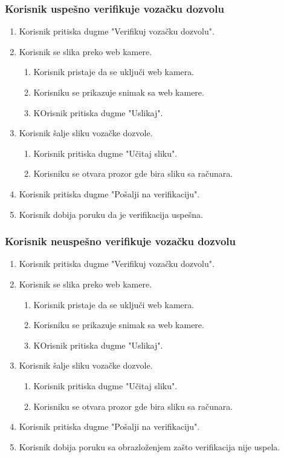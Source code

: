 \documentclass[12pt]{article}
\begin{document}
\subsubsection{Korisnik uspešno verifikuje vozačku dozvolu}
\begin{enumerate}
  \item Korisnik pritiska dugme "Verifikuj vozačku dozvolu".
  \item Korisnik se slika preko web kamere.
  \begin{enumerate}
     \item Korisnik pristaje da se uključi web kamera.
     \item Korisniku se prikazuje snimak sa web kamere.
     \item KOrisnik pritiska dugme "Uslikaj".
  \end{enumerate}
  \item Korisnik šalje sliku vozačke dozvole.
  \begin{enumerate}
     \item Korisnik pritiska dugme "Učitaj sliku".
     \item Korisniku se otvara prozor gde bira sliku sa računara.
  \end{enumerate}
  \item Korisnik pritiska dugme "Pošalji na verifikaciju".
  \item Korisnik dobija poruku da je verifikacija uspešna.
\end{enumerate}

\subsubsection{Korisnik neuspešno verifikuje vozačku dozvolu}
\begin{enumerate}
  \item Korisnik pritiska dugme "Verifikuj vozačku dozvolu".
  \item Korisnik se slika preko web kamere.
  \begin{enumerate}
     \item Korisnik pristaje da se uključi web kamera.
     \item Korisniku se prikazuje snimak sa web kamere.
     \item KOrisnik pritiska dugme "Uslikaj".
  \end{enumerate}
  \item Korisnik šalje sliku vozačke dozvole.
  \begin{enumerate}
     \item Korisnik pritiska dugme "Učitaj sliku".
     \item Korisniku se otvara prozor gde bira sliku sa računara.
  \end{enumerate}
  \item Korisnik pritiska dugme "Pošalji na verifikaciju".
  \item Korisnik dobija poruku sa obrazloženjem zašto verifikacija nije uspela.
\end{enumerate}
\end{document}
